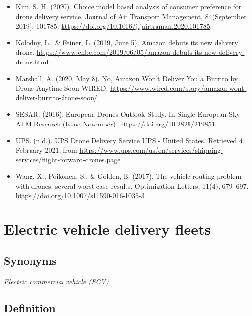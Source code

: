 \documentclass[
]{book}
\begin{document}
\begin{itemize}
\item
  Kim, S. H. (2020). Choice model based analysis of consumer preference for drone delivery service. Journal of Air Transport Management, 84(September 2019), 101785. \url{https://doi.org/10.1016/j.jairtraman.2020.101785}
\item
  Kolodny, L., \& Feiner, L. (2019, June 5). Amazon debuts its new delivery drone. \url{https://www.cnbc.com/2019/06/05/amazon-debuts-its-new-delivery-drone.html}
\item
  Marshall, A. (2020, May 8). No, Amazon Won't Deliver You a Burrito by Drone Anytime Soon \textbar{} WIRED. \url{https://www.wired.com/story/amazon-wont-deliver-burrito-drone-soon/}
\item
  SESAR. (2016). European Drones Outlook Study. In Single European Sky ATM Research (Issue November). \url{https://doi.org/10.2829/219851}
\item
  UPS. (n.d.). UPS Drone Delivery Service \textbar{} UPS - United States. Retrieved 4 February 2021, from \url{https://www.ups.com/us/en/services/shipping-services/flight-forward-drones.page}
\item
  Wang, X., Poikonen, S., \& Golden, B. (2017). The vehicle routing problem with drones: several worst-case results. Optimization Letters, 11(4), 679--697. \url{https://doi.org/10.1007/s11590-016-1035-3}
\end{itemize}

\hypertarget{electric_delivery_fleets}{%
\section{Electric vehicle delivery fleets}\label{electric_delivery_fleets}}

\hypertarget{synonyms-31}{%
\subsection*{Synonyms}\label{synonyms-31}}

\emph{Electric commercial vehicle (ECV)}

\hypertarget{definition-34}{%
\subsection*{Definition}\label{definition-34}}
\end{document}
